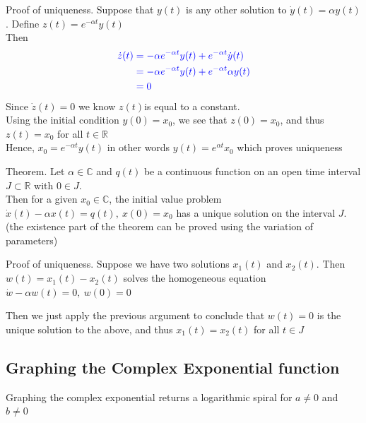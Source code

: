 \documentclass[11pt, openright]{book}
\begin{document}
\begin{dent}{Proof of uniqueness.}
    Suppose that $y(t)$ is any other solution to $\dot{y}(t)=\alpha y(t)$. Define $z(t)=e^{-\alpha t}y(t)$\\
    Then \vspace{-10pt}
    \begin{align*}
        \color{blue} \dot{z}(t) & \color{blue}=-\alpha e^{-\alpha t}y(t)+e^{-\alpha t}\dot{y}(t)  \\
                        & \color{blue}=-\alpha e^{-\alpha t}y(t)+e^{-\alpha t}\alpha y(t) \\
                        & \color{blue}=0
    \end{align*}
    Since $\dot{z}(t)=0$ we know $z(t)$is equal to a constant.\\
    Using the initial condition $y(0)=x_0$, we see that $z(0)=x_0$, and thus $z(t)=x_0$ for all $t\in\mathbb{R}$\\
    Hence, $x_0=e^{-\alpha t}y(t)$ in other words $y(t)=e^{\alpha t}x_0$ which proves uniqueness

\end{dent}

\begin{dent}{Theorem.}
    Let $\alpha\in\mathbb{C}$ and $q(t)$ be a continuous function on an open time interval $J\subset\mathbb{R}$ with $0\in J$.\\
    Then for a given $x_0\in \mathbb{C}$, the initial value problem $\dot{x}(t)-\alpha x(t)=q(t),\ x(0)=x_0$ has a unique solution on the interval $J$.\\
    (the existence part of the theorem can be proved using the variation of parameters)
\end{dent}

\begin{dent}{Proof of uniqueness.}
    Suppose we have two solutions $x_1(t)$ and $x_2(t)$. Then $w(t)=x_1(t)-x_2(t)$ solves the homogeneous equation $\dot{w}-\alpha w(t)=0,\ w(0)=0$

    Then we just apply the previous argument to conclude that $w(t)=0$ is the unique solution to the above, and thus $x_1(t)=x_2(t)$ for all $t\in J$
\end{dent}


\newpage

\subsection{Graphing the Complex Exponential function}

Graphing the complex exponential returns a logarithmic spiral for $a\neq0$ and $b\neq0$
\end{document}
